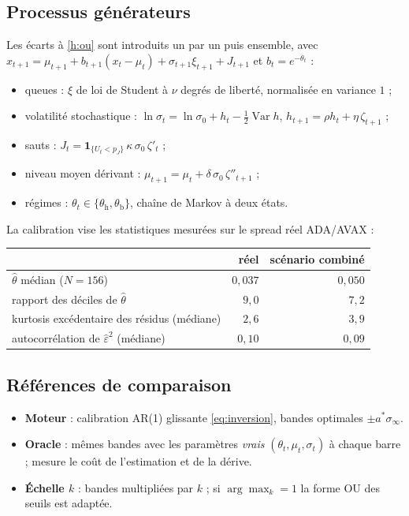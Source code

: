 \documentclass[11pt,a4paper]{article}
\theoremstyle{definition}
\theoremstyle{remark}
\newcommand{\sinf}{\sigma_\infty}
\DeclareMathOperator{\Var}{Var}
\begin{document}
\subsection{Processus générateurs}

Les écarts à \ref{h:ou} sont introduits un par un puis ensemble, avec $x_{t+1}=\mu_{t+1}+b_{t+1}(x_t-\mu_t)+\sigma_{t+1}\xi_{t+1}+J_{t+1}$ et $b_t=e^{-\theta_t}$ :
\begin{itemize}[nosep]
\item queues : $\xi$ de loi de Student à $\nu$ degrés de liberté, normalisée en variance $1$ ;
\item volatilité stochastique : $\ln\sigma_t=\ln\sigma_0+h_t-\tfrac12\Var h$, $h_{t+1}=\rho h_t+\eta\,\zeta_{t+1}$ ;
\item sauts : $J_t=\mathbf 1_{\{U_t<p_J\}}\,\kappa\,\sigma_0\,\zeta'_t$ ;
\item niveau moyen dérivant : $\mu_{t+1}=\mu_t+\delta\,\sigma_0\,\zeta''_{t+1}$ ;
\item régimes : $\theta_t\in\{\theta_{\mathrm{h}},\theta_{\mathrm{b}}\}$, chaîne de Markov à deux états.
\end{itemize}
La calibration vise les statistiques mesurées sur le spread réel ADA/AVAX :

\begin{center}
\begin{tabular}{lrr}
\toprule
 & réel & scénario combiné\\
\midrule
$\hat\theta$ médian ($N=156$) & $0{,}037$ & $0{,}050$\\
rapport des déciles de $\hat\theta$ & $9{,}0$ & $7{,}2$\\
kurtosis excédentaire des résidus (médiane) & $2{,}6$ & $3{,}9$\\
autocorrélation de $\hat\varepsilon^2$ (médiane) & $0{,}10$ & $0{,}09$\\
\bottomrule
\end{tabular}
\end{center}

\subsection{Références de comparaison}

\begin{itemize}[nosep]
\item \textbf{Moteur} : calibration AR(1) glissante \eqref{eq:inversion}, bandes optimales $\pm a^*\sinf$.
\item \textbf{Oracle} : mêmes bandes avec les paramètres \emph{vrais} $(\theta_t,\mu_t,\sigma_t)$ à chaque barre ; mesure le coût de l'estimation et de la dérive.
\item \textbf{Échelle $k$} : bandes multipliées par $k$ ; si $\arg\max_k=1$ la forme OU des seuils est adaptée.
\end{itemize}
\end{document}
